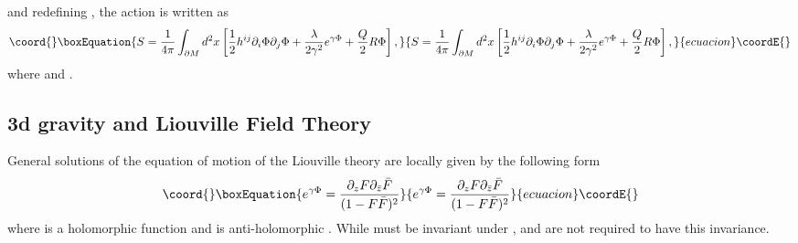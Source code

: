 \documentclass[a4paper,11pt]{article}
\begin{document}
\coordHE{} and redefining \myHighlight{$\tilde{\Phi}=\gamma\Phi$}\coordHE{} , 
the action is written as  
\begin{equation}\coord{}\boxEquation{
S=\frac{1}{4\pi}\int_{\partial M} d^2x 
 \left[\frac{1}{2}h^{ij}\partial_i \Phi\partial_j \Phi
  +\frac{\lambda}{2\gamma^2}e^{\gamma\Phi}
   +\frac{Q}{2}R\Phi\right],
}{
S=\frac{1}{4\pi}\int_{\partial M} d^2x 
 \left[\frac{1}{2}h^{ij}\partial_i \Phi\partial_j \Phi
  +\frac{\lambda}{2\gamma^2}e^{\gamma\Phi}
   +\frac{Q}{2}R\Phi\right],
}{ecuacion}\coordE{}\end{equation}
where \coordHE{} and 
\coordHE{}.

\subsection{3d gravity and Liouville Field Theory}
General solutions of the equation of motion of the Liouville theory 
are locally given by the following form \cite{Seiberg}
\begin{equation}\coord{}\boxEquation{
\label{L-sol}
e^{\gamma\Phi}=\frac{\partial_z F \partial_{\bar{z}}\bar{F}}
                             {(1-F\bar{F})^2}
}{
e^{\gamma\Phi}=\frac{\partial_z F \partial_{\bar{z}}\bar{F}}
                             {(1-F\bar{F})^2}
}{ecuacion}\coordE{}\end{equation}
where \coordHE{} is a holomorphic function \coordHE{} and 
\coordHE{} is anti-holomorphic \coordHE{}.
While \coordHE{} must be invariant 
under \coordHE{}, \coordHE{} and \coordHE{} are not required 
to have this invariance.
\end{document}
